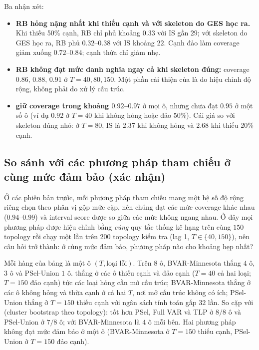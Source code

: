 Ba nhận xét:
\begin{itemize}
  \item \textbf{RB hỏng nặng nhất khi thiếu cạnh và với skeleton do GES học ra.} Khi thiếu 50\% cạnh, RB chỉ phủ khoảng $0.33$ với IS gần $29$; với skeleton do GES học ra, RB phủ $0.32$--$0.38$ với IS khoảng $22$. Cạnh đảo làm coverage giảm xuống $0.72$--$0.84$; cạnh thừa chỉ giảm nhẹ.
  \item \textbf{RB không đạt mức danh nghĩa ngay cả khi skeleton đúng:} coverage $0.86$, $0.88$, $0.91$ ở $T=40,80,150$. Một phần cải thiện của \ours{} là do hiệu chỉnh độ rộng, không phải do xử lý cấu trúc.
  \item \textbf{\ours{} giữ coverage trong khoảng $0.92$--$0.97$} ở mọi ô, nhưng chưa đạt $0.95$ ở một số ô (ví dụ $0.92$ ở $T=40$ khi không hỏng hoặc đảo 50\%). Cái giá so với skeleton đúng nhỏ: ở $T=80$, IS là $2.37$ khi không hỏng và $2.68$ khi thiếu 20\% cạnh.
\end{itemize}

\subsection{So sánh với các phương pháp tham chiếu ở cùng mức đảm bảo (xác nhận)}\label{sec:main}
Ở các phiên bản trước, mỗi phương pháp tham chiếu mang một hệ số độ rộng riêng chọn theo phân vị gộp mức cặp, nên chúng đạt các mức coverage khác nhau ($0.94$--$0.99$) và interval score được so giữa các mức không ngang nhau. Ở đây mọi phương pháp được hiệu chỉnh bằng \emph{cùng} quy tắc thống kê hạng trên cùng $150$ topology rồi chạy một lần trên $200$ topology kiểm tra (lag 1, $T\in\{40,150\}$), nên câu hỏi trở thành: ở cùng mức đảm bảo, phương pháp nào cho khoảng hẹp nhất?

\begin{table}[H]
\centering\small

\caption{Interval score trung bình ở cùng mức đảm bảo (thấp hơn là tốt hơn; đậm là thấp nhất trong các phương pháp mà khoảng tin cậy của tỉ lệ topology chạm $0.90$). $^{*}$: phương pháp không đạt mức đảm bảo ở ô đó. PSel-U: PSel-Union với ngân sách bootstrap gấp $32$ lần.}\label{tab:cmp}
\end{table}

Mỗi hàng của bảng là một ô $(T,\text{loại lỗi})$. Trên $8$ ô, BVAR-Minnesota thắng $4$ ô, \ours{} $3$ ô và PSel-Union $1$ ô. \ours{} thắng ở các ô thiếu cạnh và đảo cạnh ($T=40$ cả hai loại; $T=150$ đảo cạnh) tức các loại hỏng cần mở cấu trúc; BVAR-Minnesota thắng ở các ô không hỏng và thừa cạnh ở cả hai $T$, nơi mở cấu trúc không có ích; PSel-Union thắng ở $T=150$ thiếu cạnh với ngân sách tính toán gấp $32$ lần. So cặp với \ours{} (cluster bootstrap theo topology): \ours{} tốt hơn PSel, Full VAR và TLP ở $8/8$ ô và PSel-Union ở $7/8$ ô; với BVAR-Minnesota là $4$ ô mỗi bên. Hai phương pháp không đạt mức đảm bảo ở một ô (BVAR-Minnesota ở $T=150$ thiếu cạnh, PSel-Union ở $T=150$ đảo cạnh).

